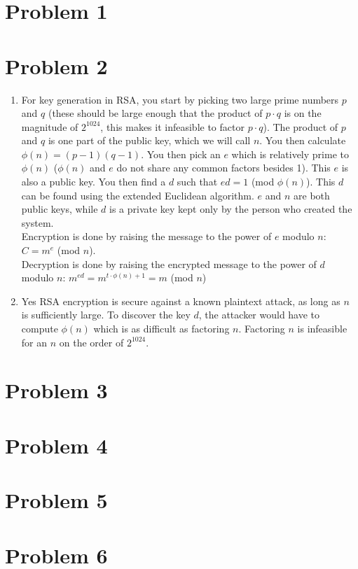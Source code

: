 \documentclass{article}
\title{\thetitle}
\author{\theauthor}
\begin{document}
\section*{Problem 1}
\section*{Problem 2}
\begin{enumerate}
\item For key generation in RSA, you start by picking two large prime numbers $p$ and $q$ (these should be large enough  that the product of $p \cdot q$ is on the magnitude of $2^1024$, this makes it infeasible to factor $p \cdot q$). The product of $p$ and $q$ is one part of the public key, which we will call $n$. You then calculate $\phi(n) = (p-1)(q-1)$. You then pick an $e$ which is relatively prime to $\phi(n)$ ($\phi(n)$ and $e$ do not share any common factors besides 1). This $e$ is also a public key. You then find a $d$ such that $ed = 1$ (mod $\phi(n)$). This $d$ can be found using the extended Euclidean algorithm. $e$ and $n$ are both public keys, while $d$ is a private key kept only by the person who created the system. \\
Encryption is done by raising the message to the power of $e$ modulo $n$: $C = m^e$ (mod $n$). \\
Decryption is done by raising the encrypted message to the power of $d$ modulo $n$: $m^{ed} = m^{t \cdot \phi(n) + 1} = m$ (mod $n$)\\
\item Yes RSA encryption is secure against a known plaintext attack, as long as $n$ is sufficiently large. To discover the key $d$, the attacker would have to compute $\phi(n)$ which is as difficult as factoring $n$. Factoring $n$ is infeasible for an $n$ on the order of $2^{1024}$. 
\end{enumerate}
\section*{Problem 3}
\section*{Problem 4}
\section*{Problem 5}
\section*{Problem 6}
\end{document}
